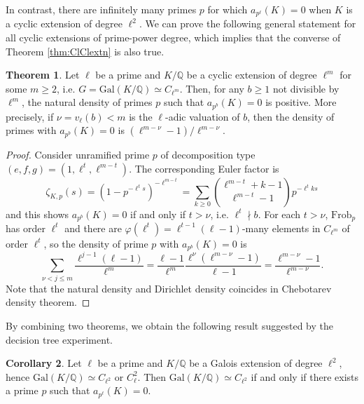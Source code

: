 \documentclass[letterpaper, 10pt]{article}
\newcommand{\Gal}{\mathrm{Gal}}
\newcommand{\bQ}{\mathbb{Q}}
\newcommand{\1}{\mathds{1}}	%
\theoremstyle{definition}
\newtheorem{theorem}{Theorem}[section]
\newtheorem{corollary}[theorem]{Corollary}
\theoremstyle{remark}
\begin{document}
In contrast, there are infinitely many primes $p$ for which $a_{p^\ell}(K) = 0$ when $K$ is a cyclic extension of degree $\ell^2$.
We can prove the following general statement for all cyclic extensions of prime-power degree,  which implies that the converse of Theorem \ref{thm:ClClextn} is also true.
\begin{theorem}
    \label{thm:cyclic_degree_lpower}
    Let $\ell$ be a prime and $K / \bQ$ be a cyclic extension of degree $\ell^m$ for some $m \ge 2$, i.e. $G = \Gal(K / \bQ) \simeq C_{\ell^m}$.
     Then, for any $b \ge 1$ not divisible by $\ell^m$, the natural density of primes $p$ such that $a_{p^b}(K) = 0$ is positive. More precisely, if $\nu = v_\ell(b) < m$ is the $\ell$-adic valuation of $b$, then the density of primes with $a_{p^b}(K) = 0$ is $(\ell^{m - \nu} - 1) / \ell^{m - \nu}$.
    
\end{theorem}
\begin{proof}
    
    Consider unramified prime $p$ of decomposition type $(e, f, g) = (1, \ell^{t}, \ell^{m-t})$.
    The corresponding Euler factor is 
    \[
        \zeta_{K, p}(s) = (1 - p^{-\ell^{t}s})^{-\ell^{m - t}} = \sum_{k \ge 0} \binom{\ell^{m-t} + k - 1}{\ell^{m-t} - 1} p^{-\ell^{t}k s}
    \]
    and this shows $a_{p^b}(K) = 0$ if and only if $t > \nu$, i.e. $\ell^t \nmid b$.
    For each $t > \nu$, $\mathrm{Frob}_p$ has order $\ell^{t}$ and there are $\varphi(\ell^t) = \ell^{t - 1}(\ell - 1)$-many elements in $C_{\ell^m}$ of order $\ell^t$, so the density of prime $p$ with $a_{p^b}(K) = 0$ is
    \[
    \sum_{\nu < j \le m} \frac{\ell^{j-1}(\ell - 1)}{\ell^m} = \frac{\ell - 1}{\ell^m} \frac{\ell^{\nu}(\ell^{m - \nu} - 1)}{\ell - 1} = \frac{\ell^{m - \nu} - 1}{\ell^{m -\nu}}.
    \]
    Note that the natural density and Dirichlet density coincides in Chebotarev density theorem.
    
\end{proof}

 By combining two theorems, we obtain the following result suggested by the decision tree experiment.
\begin{corollary}
\label{cor:ellsqzeta}
    Let $\ell$ be a prime and $K / \bQ$ be a Galois extension of degree $\ell^2$, hence $\Gal(K/\bQ) \simeq C_{\ell^2}$ or $C_{\ell}^2$.
    Then $\Gal(K / \bQ) \simeq C_{\ell^2}$ if and only if there exists a prime $p$ such that $a_{p^\ell}(K) = 0$.
\end{corollary}
\end{document}
